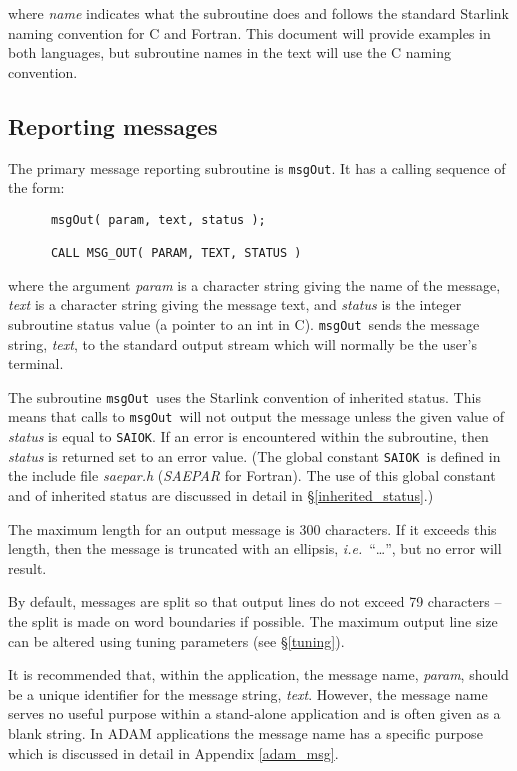 \documentclass[twoside,11pt]{article}
\newcommand{\htmlref}[2]{#1}
\newcommand{\latex}[1]{#1}
\newcommand{\xlabel}[1]{}
\renewcommand{\_}{\texttt{\symbol{95}}}
\newcommand{\func}[1]{\texttt{#1}}
\newcommand{\farg}[1]{\textit{#1}}
\newcommand{\const}[1]{\texttt{#1}}
\newcommand{\fname}[1]{\textit{#1}}
\newcommand{\saiok}{\const{SAI\_\_OK}}
\newcommand{\msgout}{\func{msgOut}}
\begin{document}
where \farg{name} indicates what the subroutine does and follows the
standard Starlink naming convention for C and Fortran. This document will
provide examples in both languages, but subroutine names in the text
will use the C naming convention.

\subsection{\xlabel{reporting_messages}Reporting messages}

The primary message reporting subroutine is \msgout.
It has a calling sequence of the form:

\begin {small}
\begin{verbatim}
      msgOut( param, text, status );

      CALL MSG_OUT( PARAM, TEXT, STATUS )
\end{verbatim}
\end {small}

where the argument \farg{param} is a character string giving the name of the message,
\farg{text} is a character string giving the message text, and \farg{status} is the
integer subroutine status value (a pointer to an int in C).
\msgout\ sends the message string, \farg{text}, to the
standard output stream which will normally be the user's terminal.

The subroutine \msgout\ uses the Starlink convention of
\htmlref{inherited status}{inherited_status}.
This means that calls to \msgout\ will not output the message unless the
given value of \farg{status} is equal to \saiok.
If an error is encountered within the subroutine, then \farg{status} is returned
set to an error value.
(The global constant \saiok\ is defined in the include file
\fname{sae\_par.h} (\fname{SAE\_PAR} for Fortran).
\latex{The use of this global constant and of inherited status are discussed in detail
in \S\ref{inherited_status}.})

The maximum length for an output message is 300 characters.
If it exceeds this length, then the message is truncated with
an ellipsis, \textit{i.e.}\ ``\ldots'', but no error will result.

By default, messages are split so that output lines do not exceed
79 characters -- the split is made on word boundaries if possible.
The maximum output line size can be altered using
\htmlref{tuning parameters}{tuning}\latex{ (see \S\ref{tuning})}.

It is recommended that,
within the application, the message name, \farg{param}, should be a unique identifier
for the message string, \farg{text}.
However, the message name serves no useful purpose within a stand-alone
application and is often given as a blank string.
In ADAM applications the message name has a
\htmlref
{specific purpose}{mespar_sect}\latex{ which is discussed in detail in Appendix \ref{adam_msg}}.
\end{document}
